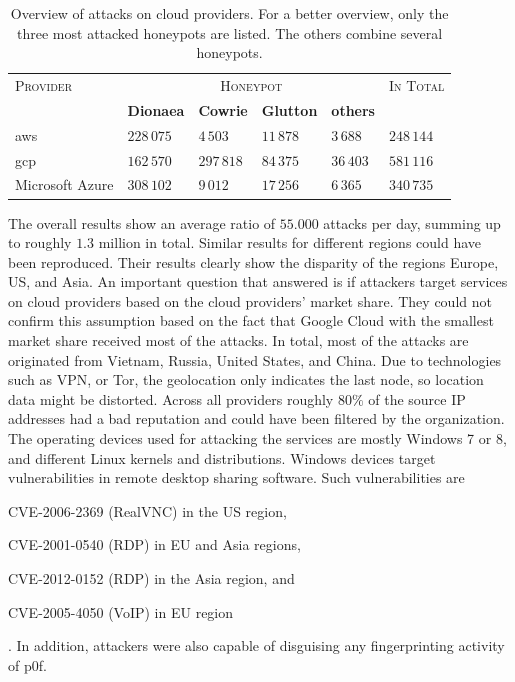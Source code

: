 \begin{table}
    \centering
    \caption[Overview of attacks on cloud providers]{Overview of attacks on cloud providers. For a better overview, only the three most attacked honeypots are listed. The others combine several honeypots.}
    \begin{tabularx}{\linewidth}{l|XXXX|l}
        \toprule
        \textsc{Provider} & \multicolumn{4}{c|}{\textsc{Honeypot}} & \textsc{In Total}                                                   \\
                          & \textbf{Dionaea}                       & \textbf{Cowrie}   & \textbf{Glutton} & \textbf{others} &            \\
        \hline
        \acl{aws}         & $228\,075$                             & $4\,503$          & $11\,878$        & $3\,688$        & $248\,144$ \\
        \acl{gcp}         & $162\,570$                             & $297\,818$        & $84\,375$        & $36\,403$       & $581\,116$ \\
        Microsoft Azure   & $308\,102$                             & $9\,012$          & $17\,256$        & $6\,365$        & $340\,735$ \\
        \bottomrule
    \end{tabularx}
    \label{tab:overview-cloud-security}
\end{table}

The overall results show an average ratio of $55.000$ attacks per day, summing up to roughly $1.3$ million in total.
Similar results for different regions could have been reproduced.
Their results clearly show the disparity of the regions Europe, US, and Asia.
An important question that \citet{Kelly2021} answered is if attackers target services on cloud providers based on the cloud providers' market share.
They could not confirm this assumption based on the fact that Google Cloud with the smallest market share received most of the attacks.
In total, most of the attacks are originated from Vietnam, Russia, United States, and China.
Due to technologies such as VPN, or Tor, the geolocation only indicates the last node, so location data might be distorted.
Across all providers roughly $80\%$ of the source IP addresses had a bad reputation and could have been filtered by the organization.
The operating devices used for attacking the services are mostly Windows 7 or 8, and different Linux kernels and distributions.
Windows devices target vulnerabilities in remote desktop sharing software. Such vulnerabilities are
\begin{enumerate*}[label=(\roman*)]
    \item CVE-2006-2369\cite{CVE-2006-2369} (RealVNC) in the US region,
    \item CVE-2001-0540\cite{CVE-2001-0540} (RDP) in EU and Asia regions,
    \item CVE-2012-0152\cite{CVE-2012-0152} (RDP) in the Asia region, and
    \item CVE-2005-4050\cite{CVE-2005-4050} (VoIP) in EU region
\end{enumerate*}.
In addition, attackers were also capable of disguising any fingerprinting activity of p0f.

